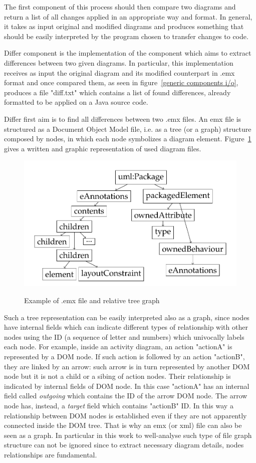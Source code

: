 The first component of this process should then compare two diagrams and return a list of all changes applied in an appropriate way and format. In general, it takes as input original and modified diagrams and produces something that should be easily interpreted by the program chosen to transfer changes to code.

Differ component is the implementation of the component which aims to extract differences between two given diagrams. In particular, this implementation receives as input the original diagram and its modified counterpart in .emx format and once compared them, as seen in figure~\ref{generic components i/o}, produces a file "diff.txt" which contains a list of found differences, already formatted to be applied on a Java source code. 

Differ first aim is to find all differences between two .emx files. An emx file is structured as a Document Object Model file, i.e. as a tree (or a graph) structure composed by nodes, in which each node symbolizes a diagram element. Figure~\ref{fig:DOMtree} gives a written and graphic representation of used diagram files.
\begin{figure}[htbp]
  \centering
  \includegraphics[width=.7\textwidth]{figs/DOMtree}\\
  \vspace*{10pt}
\caption{Example of .emx file and relative tree graph}\label{fig:DOMtree}
\end{figure}
Such a tree representation can be easily interpreted also as a graph, since nodes have internal fields which can indicate different types of relationship with other nodes using the ID (a sequence of letter and numbers) which univocally labels each node. For example, inside an activity diagram, an action "actionA" is represented by a DOM node. If such action is followed by an action "actionB", they are linked by an arrow: such arrow is in turn represented by another DOM node but it is not a child or a sibing of action nodes. Their relationship is indicated by internal fields of DOM node. In this case "actionA" has an internal field called \textit{outgoing} which contains the ID of the arrow DOM node. The arrow node has, instead, a \textit{target} field which contains "actionB" ID. In this way a relationship between DOM nodes is established even if they are not apparently connected inside the DOM tree. That is why an emx (or xml) file can also be seen as a graph.
In particular in this work to well-analyse such type of file graph structure can not be ignored since to extract necessary diagram details, nodes relationships are fundamental.

